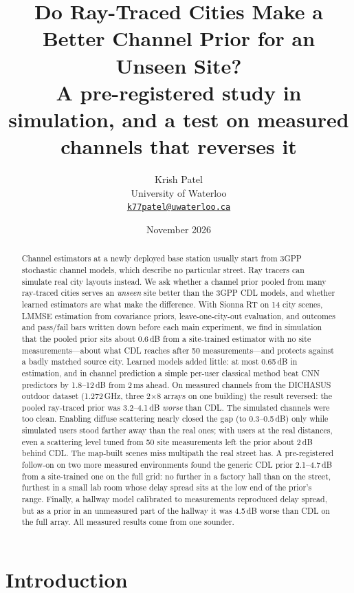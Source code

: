 \documentclass[11pt]{article}
\title{Do Ray-Traced Cities Make a Better Channel Prior for an Unseen Site?\\[4pt]
\large A pre-registered study in simulation, and a test on measured channels that reverses it}
\author{Krish Patel\\
\normalsize University of Waterloo\\
\normalsize \href{mailto:k77patel@uwaterloo.ca}{\texttt{k77patel@uwaterloo.ca}}}
\date{November 2026}
\begin{document}
\maketitle

\begin{abstract}
Channel estimators at a newly deployed base station usually start from 3GPP
stochastic channel models, which describe no particular street. Ray tracers
can simulate real city layouts instead. We ask whether a channel prior pooled
from many ray-traced cities serves an \emph{unseen} site better than the 3GPP
CDL models, and whether learned estimators are what make the difference. With
Sionna RT on 14 city scenes, LMMSE estimation from covariance priors,
leave-one-city-out evaluation, and outcomes and pass/fail bars written down
before each main experiment, we find in simulation that the pooled prior sits
about 0.6\,dB from a site-trained estimator with no site measurements---about
what CDL reaches after 50 measurements---and protects against a badly matched
source city. Learned models added little: at most 0.65\,dB in estimation, and
in channel prediction a simple per-user classical method beat CNN predictors
by 1.8--12\,dB from 2\,ms ahead. On measured channels from the DICHASUS outdoor
dataset (1.272\,GHz, three 2$\times$8 arrays on one building) the result
reversed: the pooled ray-traced prior was 3.2--4.1\,dB \emph{worse} than CDL.
The simulated channels were too clean. Enabling diffuse scattering nearly
closed the gap (to 0.3--0.5\,dB) only while simulated users stood farther away
than the real ones; with users at the real distances, even a scattering level
tuned from 50 site measurements left the prior about 2\,dB behind CDL. The map-built scenes miss
multipath the real street has. A pre-registered follow-on on two more measured
environments found the generic CDL prior 2.1--4.7\,dB from a site-trained one
on the full grid:
no further in a factory hall than on the street, furthest in a small lab room
whose delay spread sits at the low end of the prior's range. Finally, a hallway
model calibrated to measurements reproduced delay
spread, but as a prior in an unmeasured part of the hallway it was 4.5\,dB
worse than CDL on the full array. All measured results come from one sounder.
\end{abstract}

\section{Introduction}
\end{document}
